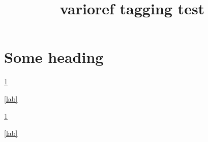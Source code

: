 \documentclass{article}
\title{varioref tagging test}
\begin{document}
\section{Some heading}\label{lab}

\ref{lab}\par
\vref{lab}\par
{}

\newpage

\ref{lab}\par
\vref{lab}\par
{}
\end{document}
